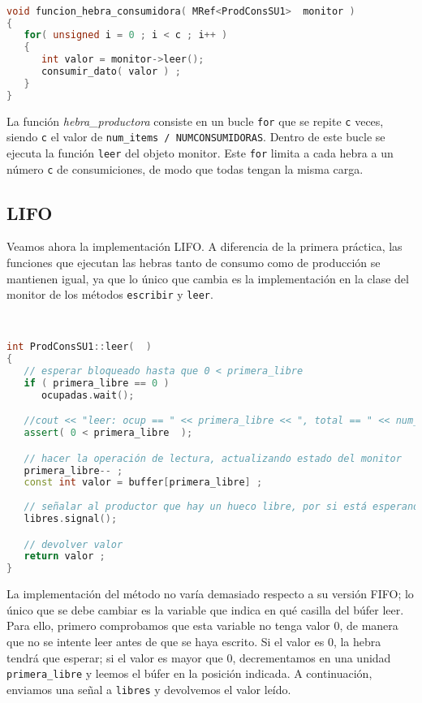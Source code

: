 \documentclass{article}
\begin{document}
\begin{lstlisting}[language=C++,caption=función hebra consumidora multiple ] 

void funcion_hebra_consumidora( MRef<ProdConsSU1>  monitor )
{
   for( unsigned i = 0 ; i < c ; i++ )
   {
      int valor = monitor->leer();
      consumir_dato( valor ) ;
   }
}
\end{lstlisting}
La función \textit{hebra\_productora} consiste en un bucle \texttt{for} que se repite \texttt{c} veces, siendo \texttt{c} el valor de \texttt{num\_items / NUMCONSUMIDORAS}. Dentro de este bucle se ejecuta la función \texttt{leer} del objeto monitor. Este \texttt{for} limita a cada hebra a un número \texttt{c} de consumiciones, de modo que todas tengan la misma carga.



\subsection{LIFO}
Veamos ahora la implementación LIFO. A diferencia de la primera práctica, las funciones que ejecutan las hebras tanto de consumo como de producción se mantienen igual, ya que lo único que cambia es la implementación en la clase del monitor de los métodos \texttt{escribir} y \texttt{leer}.



\begin{lstlisting}[language=C++,caption=función leer monitor LIFO ] 


int ProdConsSU1::leer(  )
{
   // esperar bloqueado hasta que 0 < primera_libre
   if ( primera_libre == 0 )
      ocupadas.wait();

   //cout << "leer: ocup == " << primera_libre << ", total == " << num_celdas_total << endl ;
   assert( 0 < primera_libre  );

   // hacer la operación de lectura, actualizando estado del monitor
   primera_libre-- ;
   const int valor = buffer[primera_libre] ;
   
   // señalar al productor que hay un hueco libre, por si está esperando
   libres.signal();

   // devolver valor
   return valor ;
}
\end{lstlisting}
La implementación del método no varía demasiado respecto a su versión FIFO; lo único que se debe cambiar es la variable que indica en qué casilla del búfer leer. Para ello, primero comprobamos que esta variable no tenga valor 0, de manera que no se intente leer antes de que se haya escrito. Si el valor es 0, la hebra tendrá que esperar; si el valor es mayor que 0, decrementamos en una unidad \texttt{primera\_libre} y leemos el búfer en la posición indicada. A continuación, enviamos una señal a \texttt{libres} y devolvemos el valor leído.
\end{document}
